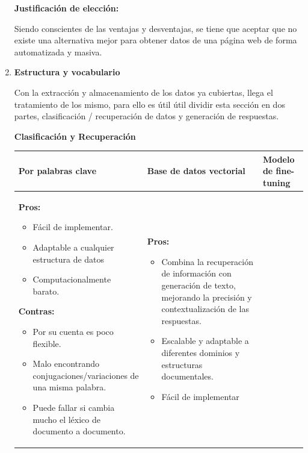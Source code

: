 \documentclass{article}
\begin{document}
\begin{enumerate}
    \textbf{Justificación de elección:} 
    
    Siendo conscientes de las ventajas y desventajas, se tiene que aceptar que no existe una alternativa mejor para obtener datos de una página web de forma automatizada y masiva. 
    
    \item  \textbf{Estructura y vocabulario}
    
        Con la extracción y almacenamiento de los datos ya cubiertas, llega el tratamiento de los mismo, para ello es útil útil dividir esta sección en dos partes, clasificación / recuperación de datos y generación de respuestas.
        
    \textbf{Clasificación y Recuperación}
    \begin{table}[H]
    \centering
    \begin{tabular}{p{4.5cm}|p{4.5cm}|p{4.5cm}}
    \textbf{Por palabras clave} & \textbf{Base de datos vectorial} & \textbf{Modelo de fine-tuning} \\
    \hline
    \vspace{0.025cm}
    \textbf{Pros:}
    \begin{itemize}[left=0.15pt]
        \item Fácil de implementar.
        \item Adaptable a cualquier estructura de datos
        \item Computacionalmente barato.
    \end{itemize}
    \textbf{Contras:}
    \begin{itemize}[left=0.15pt]
        \item Por su cuenta es poco flexible.
        \item Malo encontrando conjugaciones/variaciones de una misma palabra.
        \item Puede fallar si cambia mucho el léxico de documento a documento.
    \end{itemize}
    &
    \vspace{0.025cm}
    \textbf{Pros:}
    \begin{itemize}[left=0.15pt]
        \item Combina la recuperación de información con generación de texto, mejorando la precisión y contextualización de las respuestas.
        \item Escalable y adaptable a diferentes dominios y estructuras documentales.
        \item Fácil de implementar
    \end{itemize}

\end{tabular}
\end{table}
\end{enumerate}
\end{document}
